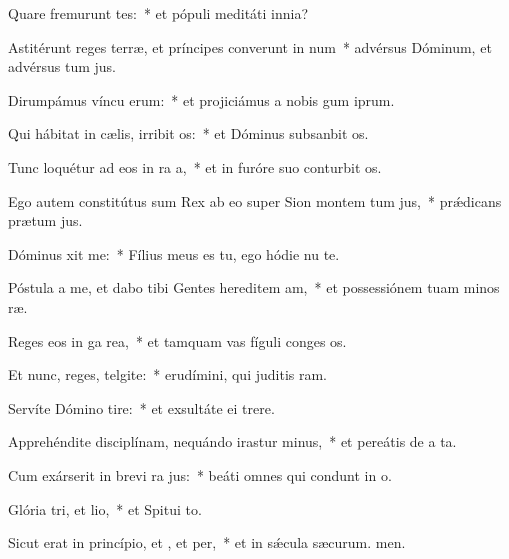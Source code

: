 \item Quare fremurunt tes:~* et pópuli meditáti  innia?
\item Astitérunt reges terræ, et príncipes converunt in num~* advérsus Dóminum, et advérsus tum jus.
\item Dirumpámus víncu erum:~* et projiciámus a nobis gum iprum.
\item Qui hábitat in cælis, irribit os:~* et Dóminus subsanbit os.
\item Tunc loquétur ad eos in ra a,~* et in furóre suo conturbit os.
\item Ego autem constitútus sum Rex ab eo super Sion montem tum jus,~* prǽdicans prætum jus.
\item Dóminus xit  me:~* Fílius meus es tu, ego hódie nu te.
\item Póstula a me, et dabo tibi Gentes hereditem am,~* et possessiónem tuam minos ræ.
\item Reges eos in ga rea,~* et tamquam vas fíguli conges os.
\item Et nunc, reges, telgite:~* erudímini, qui juditis ram.
\item Servíte Dómino  tire:~* et exsultáte ei  trere.
\item Apprehéndite disciplínam, nequándo irastur minus,~* et pereátis de a ta.
\item Cum exárserit in brevi ra jus:~* beáti omnes qui condunt in o.
\item Glória tri, et lio,~* et Spitui to.
\item Sicut erat in princípio, et , et per,~* et in sǽcula sæcurum. men.
